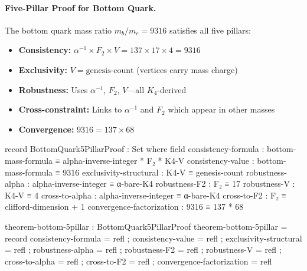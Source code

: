 \documentclass[11pt,a4paper]{book}
\begin{document}
\paragraph{Five-Pillar Proof for Bottom Quark.}
The bottom quark mass ratio $m_b/m_e = 9316$ satisfies all five pillars:
\begin{itemize}
\item \textbf{Consistency:} $\alpha^{-1} \times F_2 \times V = 137 \times 17 \times 4 = 9316$
\item \textbf{Exclusivity:} $V = \text{genesis-count}$ (vertices carry mass charge)
\item \textbf{Robustness:} Uses $\alpha^{-1}$, $F_2$, $V$---all $K_4$-derived
\item \textbf{Cross-constraint:} Links to $\alpha^{-1}$ and $F_2$ which appear in other masses
\item \textbf{Convergence:} $9316 = 137 \times 68$
\end{itemize}

\begin{code}
record BottomQuark5PillarProof : Set where
  field
    consistency-formula : bottom-mass-formula ≡ alpha-inverse-integer * F₂ * K4-V
    consistency-value : bottom-mass-formula ≡ 9316
    exclusivity-structural : K4-V ≡ genesis-count
    robustness-alpha : alpha-inverse-integer ≡ α-bare-K4
    robustness-F2 : F₂ ≡ 17
    robustness-V : K4-V ≡ 4
    cross-to-alpha : alpha-inverse-integer ≡ α-bare-K4
    cross-to-F2 : F₂ ≡ clifford-dimension + 1
    convergence-factorization : 9316 ≡ 137 * 68
    
theorem-bottom-5pillar : BottomQuark5PillarProof
theorem-bottom-5pillar = record
  { consistency-formula = refl
  ; consistency-value = refl
  ; exclusivity-structural = refl
  ; robustness-alpha = refl
  ; robustness-F2 = refl
  ; robustness-V = refl
  ; cross-to-alpha = refl
  ; cross-to-F2 = refl
  ; convergence-factorization = refl
  }
\end{code}
\end{document}
